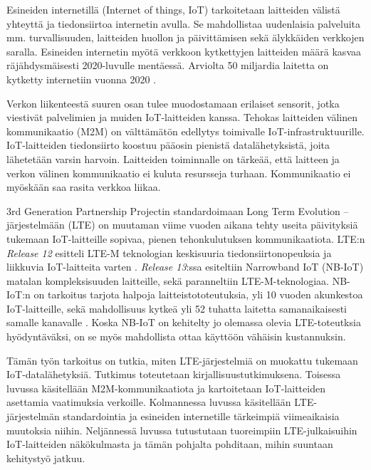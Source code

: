 \documentclass[finnish,12pt,a4paper,pdftex]{article}
\begin{document}
Esineiden internetillä (Internet of things, IoT) tarkoitetaan laitteiden välistä yhteyttä ja tiedonsiirtoa internetin avulla. Se mahdollistaa uudenlaisia palveluita mm. turvallisuuden, laitteiden huollon ja päivittämisen sekä älykkäiden verkkojen saralla. Esineiden internetin myötä verkkoon kytkettyjen laitteiden määrä kasvaa räjähdysmäisesti 2020-luvulle mentäessä. Arviolta 50 miljardia laitetta on kytketty internetiin vuonna 2020 \cite{ratasuk2016nb}.

Verkon liikenteestä suuren osan tulee muodostamaan erilaiset sensorit, jotka viestivät palvelimien ja muiden IoT-laitteiden kanssa. Tehokas laitteiden välinen kommunikaatio (M2M) on välttämätön edellytys toimivalle IoT-infrastruktuurille. IoT-laitteiden tiedonsiirto koostuu pääosin pienistä datalähetyksistä, joita lähetetään varsin harvoin. Laitteiden toiminnalle on tärkeää, että laitteen ja verkon välinen kommunikaatio ei kuluta resursseja turhaan. Kommunikaatio ei myöskään saa rasita verkkoa liikaa. \cite{nokiawhitepaper}

3rd Generation Partnership Projectin standardoimaan Long Term Evolution --järjestelmään (LTE) on muutaman viime vuoden aikana tehty useita päivityksiä tukemaan IoT-laitteille sopivaa, pienen tehonkulutuksen kommunikaatiota. LTE:n \textit{Release 12} \cite{release12} esitteli LTE-M teknologian keskisuuria tiedonsiirtonopeuksia ja liikkuvia IoT-laitteita varten \cite{ratasuk2016overview}. \textit{Release 13}:ssa \cite{release13} esiteltiin Narrowband IoT (NB-IoT) matalan kompleksisuuden laitteille, sekä paranneltiin LTE-M-teknologiaa. NB-IoT:n on tarkoitus tarjota halpoja laitteistototeutuksia, yli 10 vuoden akunkestoa IoT-laitteille, sekä mahdollisuus kytkeä yli 52 tuhatta laitetta samanaikaisesti samalle kanavalle \cite{nokiawhitepaper}. Koska NB-IoT on kehitelty jo olemassa olevia LTE-toteutksia hyödyntäväksi, on se myös mahdollista ottaa käyttöön vähäisin kustannuksin.

Tämän työn tarkoitus on tutkia, miten LTE-järjestelmiä on muokattu tukemaan IoT-datalähetyksiä. Tutkimus toteutetaan kirjallisuustutkimuksena. Toisessa luvussa käsitellään M2M-kommunikaatiota ja kartoitetaan IoT-laitteiden asettamia vaatimuksia verkoille. Kolmannessa luvussa käsitellään LTE-järjestelmän standardointia ja esineiden internetille tärkeimpiä viimeaikaisia muutoksia niihin. Neljännessä luvussa tutustutaan tuoreimpiin LTE-julkaisuihin IoT-laitteiden näkökulmasta ja tämän pohjalta pohditaan, mihin suuntaan kehitystyö jatkuu.

\clearpage
\end{document}
